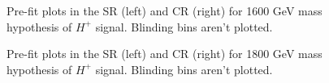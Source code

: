\begin{figure}[H]
  \centering
  \caption{Pre-fit plots in the SR (left) and CR (right) for 1600 GeV mass hypothesis of $H^{+}$ signal. Blinding bins aren't plotted.}
  \label{fig:Prefit_Hp1600_Blind}
\end{figure}
\begin{figure}[H]
  \centering
  \caption{Pre-fit plots in the SR (left) and CR (right) for 1800 GeV mass hypothesis of $H^{+}$ signal. Blinding bins aren't plotted.}
  \label{fig:Prefit_Hp1800_Blind}
\end{figure}
